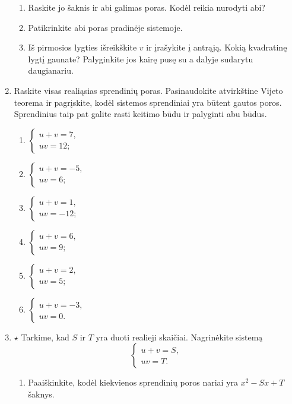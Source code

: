 \documentclass[12pt,a4paper]{article}
\begin{document}
\begin{enumerate}[series=uzdaviniai]
\begin{enumerate}
\item Raskite jo šaknis ir abi galimas poras. Kodėl reikia nurodyti abi?
\item Patikrinkite abi poras pradinėje sistemoje.
\item Iš pirmosios lygties išreikškite $v$ ir įrašykite į antrąją. Kokią kvadratinę lygtį gaunate? Palyginkite jos kairę pusę su a dalyje sudarytu daugianariu.
\end{enumerate}
\item Raskite visas realiąsias sprendinių poras. Pasinaudokite atvirkštine Vijeto teorema ir pagrįskite, kodėl sistemos sprendiniai yra būtent gautos poros. Sprendinius taip pat galite rasti keitimo būdu ir palyginti abu būdus.
\begin{multicols}{2}\begin{enumerate}
\item $\begin{cases}u+v=7,\\uv=12;\end{cases}$ \item $\begin{cases}u+v=-5,\\uv=6;\end{cases}$
\item $\begin{cases}u+v=1,\\uv=-12;\end{cases}$ \item $\begin{cases}u+v=6,\\uv=9;\end{cases}$
\item $\begin{cases}u+v=2,\\uv=5;\end{cases}$ \item $\begin{cases}u+v=-3,\\uv=0.\end{cases}$
\end{enumerate}\end{multicols}
\item $\star$ Tarkime, kad $S$ ir $T$ yra duoti realieji skaičiai. Nagrinėkite sistemą
\[\begin{cases}u+v=S,\\uv=T.\end{cases}\]
\begin{enumerate}
\item Paaiškinkite, kodėl kiekvienos sprendinių poros nariai yra $x^2-Sx+T$ šaknys.

\end{enumerate}
\end{enumerate}
\end{document}
